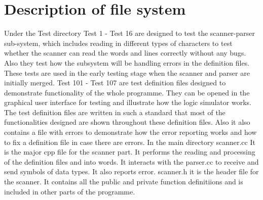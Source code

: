 \documentclass[12pt]{article}
\begin{document}
\section{Description of file system}
Under the Test directory
Test 1 - Test 16 are designed to test the scanner-parser sub-system, which includes reading in different types of characters 
to test whether the scanner can read the words and lines correctly without any bugs. Also they test how the subsystem will be 
handling errors in the definition files. These tests are used in the early testing stage when the scanner and parser are 
initially merged.
Test 101 - Test 107 are test definition files designed to demonstrate functionality of the whole programme. They can be opened 
in the graphical user interface for testing and illustrate how the logic simulator works. The test definition files are written
 in such a standard that most of the functionalities designed are shown throughout these definition files. Also it also contains
 a file with errors to demonstrate how the error reporting works and how to fix a definition file in case there are errors.
In the main directory 
scanner.cc It is the major cpp file for the scanner part. It performs the reading and processing of the definition files and into
 words. It interacts with the parser.cc to receive and send symbols of data types. It also reports error.
scanner.h it is the header file for the scanner. It contains all the public and private function definitiions and is included in 
other parts of the programme.
\end{document}
